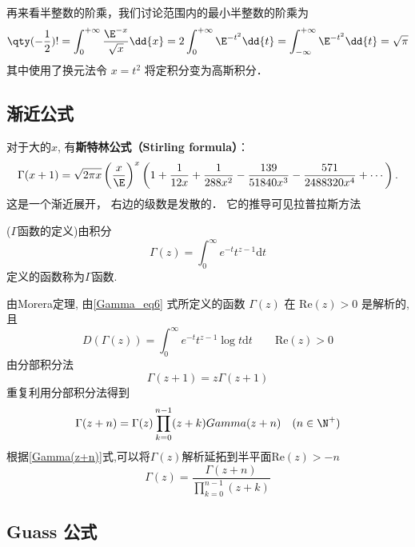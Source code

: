 再来看半整数的阶乘，我们讨论范围内的最小半整数的阶乘为 
\begin{equation}
\qty(-\frac12) ! = \int_0^{+\infty} \frac{\E^{-x}}{\sqrt x}\dd{x} = 2\int_0^{+\infty} \E^{-t^2} \dd{t} = \int_{-\infty}^{+\infty} \E^{-t^2} \dd{t} = \sqrt{\pi}
\end{equation}
其中使用了换元法令 $x = t^2$ 将定积分变为高斯积分．

\subsection{渐近公式}
对于大的$x$, 有\textbf{斯特林公式（Stirling formula）}：
$$
\Gamma(x+1)
  =\sqrt{2\pi x}\left({x\over \E}\right)^x
  \left(
   1
   +{1\over12x}
   +{1\over288x^2}
   -{139\over51840x^3}
   -{571\over2488320x^4}
   + \cdots
  \right).
$$
这是一个渐近展开， 右边的级数是发散的． 它的推导可见拉普拉斯方法

\begin{definition}{}
		($\Gamma$函数的定义)由积分
		\begin{equation}
			\Gamma(z)=\int_{0}^{\infty}e^{-t}t^{z-1}\mathrm{d}t\label{Gamma_eq6}
		\end{equation}
		定义的函数称为$\Gamma$函数.
	\end{definition}

	由Morera定理, 由\autoref{Gamma_eq6} 式所定义的函数 $\Gamma(z)$ 在 $\mathrm{Re}(z)>0$ 是解析的,且
	\[
		D(\Gamma(z))=\int_{0}^{\infty}e^{-t}t^{z-1}\log t\mathrm{d}t\qquad\mathrm{Re}(z)>0
	\]
	由分部积分法
	\[
		\Gamma(z+1)=z\Gamma(z+1)
	\]
	重复利用分部积分法得到
	\begin{equation}
		\Gamma(z+n)=\Gamma(z)\prod_{k=0}^{n-1}(z+k){Gamma(z+n)}\quad(n\in{\N^{+}})
	\end{equation}
	根据\eqref{Gamma(z+n)}式,可以将$\Gamma(z)$解析延拓到半平面$\mathrm{Re}(z)>-n$
	\[
		\Gamma(z)=\frac{\Gamma(z+n)}{\displaystyle{\prod_{k=0}^{n-1}(z+k)}}
	\]

	\subsection{Guass 公式}

